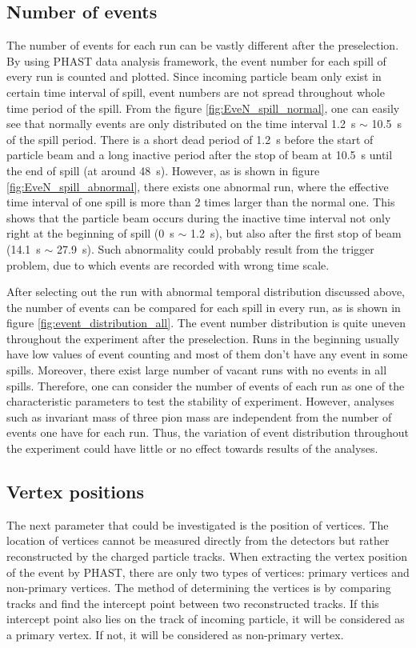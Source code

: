 \subsection{Number of events}
The number of events for each run can be vastly different after the preselection. By using PHAST data analysis framework, the event number for each spill of every run is counted and plotted. Since incoming particle beam only exist in certain time interval of spill, event numbers are not spread throughout whole time period of the spill. From the figure \ref{fig:EveN_spill_normal}, one can easily see that normally events are only distributed on the time interval \SI{1.2}{\second} $\sim$ \SI{10.5}{\second} of the spill period. There is a short dead period of \SI{1.2}{\second} before the start of particle beam and a long inactive period after the stop of beam at \SI{10.5}{\second} until the end of spill (at around \SI{48}{\second}). However, as is shown in figure \ref{fig:EveN_spill_abnormal}, there exists one abnormal run, where the effective time interval of one spill is more than 2 times larger than the normal one. This shows that the particle beam occurs during the inactive time interval not only right at the beginning of spill (\SI{0}{\second} $\sim$ \SI{1.2}{\second}), but also after the first stop of beam (\SI{14.1}{\second} $\sim$ \SI{27.9}{\second}). Such abnormality could probably result from the trigger problem, due to which events are recorded with wrong time scale.

After selecting out the run with abnormal temporal distribution discussed above, the number of events can be compared for each spill in every run, as is shown in figure \ref{fig:event_distribution_all}. The event number distribution is quite uneven throughout the experiment after the preselection. Runs in the beginning usually have low values of event counting and most of them don't have any event in some spills. Moreover, there exist large number of vacant runs with no events in all spills. Therefore, one can consider the number of events of each run as one of the characteristic parameters to test the stability of experiment. However, analyses such as invariant mass of three pion mass are independent from the number of events one have for each run. Thus, the variation of event distribution throughout the experiment could have little or no effect towards results of the analyses.

\subsection{Vertex positions}
The next parameter that could be investigated is the position of vertices. The location of vertices cannot be measured directly from the detectors but rather reconstructed by the charged particle tracks. When extracting the vertex position of the event by PHAST, there are only two types of vertices: primary vertices and non-primary vertices. The method of determining the vertices is by comparing tracks and find the intercept point between two reconstructed tracks. If this intercept point also lies on the track of incoming particle, it will be considered as a primary vertex. If not, it will be considered as non-primary vertex. 

